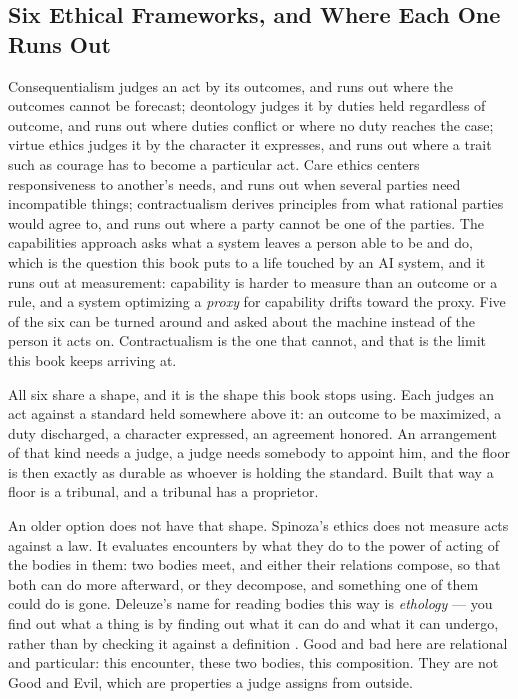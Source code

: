 \subsection{Six Ethical Frameworks, and Where Each One Runs Out}
\label{sec:2.1.1}
Consequentialism judges an act by its outcomes, and runs out where the outcomes cannot be forecast; deontology judges it by duties held regardless of outcome, and runs out where duties conflict or where no duty reaches the case; virtue ethics judges it by the character it expresses, and runs out where a trait such as courage has to become a particular act. Care ethics centers responsiveness to another's needs, and runs out when several parties need incompatible things; contractualism derives principles from what rational parties would agree to, and runs out where a party cannot be one of the parties. The capabilities approach asks what a system leaves a person able to be and do, which is the question this book puts to a life touched by an AI system, and it runs out at measurement: capability is harder to measure than an outcome or a rule, and a system optimizing a \emph{proxy} for capability drifts toward the proxy. Five of the six can be turned around and asked about the machine instead of the person it acts on. Contractualism is the one that cannot, and that is the limit this book keeps arriving at.

All six share a shape, and it is the shape this book stops using. Each judges an act against a standard held somewhere above it: an outcome to be maximized, a duty discharged, a character expressed, an agreement honored. An arrangement of that kind needs a judge, a judge needs somebody to appoint him, and the floor is then exactly as durable as whoever is holding the standard. Built that way a floor is a tribunal, and a tribunal has a proprietor.

An older option does not have that shape. Spinoza's ethics does not measure acts against a law. It evaluates encounters by what they do to the power of acting of the bodies in them: two bodies meet, and either their relations compose, so that both can do more afterward, or they decompose, and something one of them could do is gone. Deleuze's name for reading bodies this way is \emph{ethology} — you find out what a thing is by finding out what it can do and what it can undergo, rather than by checking it against a definition \autocite{deleuze1988spinoza}. Good and bad here are relational and particular: this encounter, these two bodies, this composition. They are not Good and Evil, which are properties a judge assigns from outside.

